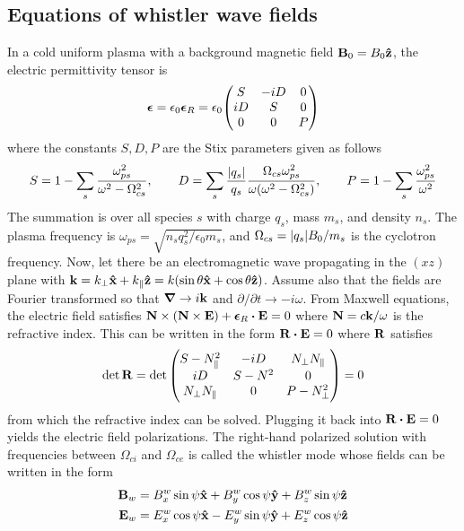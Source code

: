 \subsection{Equations of whistler wave fields}\label{sec:whistler}

In a cold uniform plasma with a background magnetic field
$\vb{B}_0=B_0\vb{\hat{z}}$, the electric
permittivity tensor is
\begin{equation}
    \bm\epsilon=\epsilon_0\bm\epsilon_R=\epsilon_0\mqty(S&-iD&0\\iD&S&0\\0&0&P)
\end{equation}
where the constants $S,D,P$ are the Stix parameters \citep{Stix1992} given as
follows
\begin{equation}
    S=1-\sum_s\frac{\omega_{ps}^2}{\omega^2-\Omega_{cs}^2}, \qquad
    D=\sum_s\frac{\abs{q_s}}{q_s}\frac{\Omega_{cs}\omega_{ps}^2}{\omega\qty(\omega^2-\Omega_{cs}^2)},
    \qquad P=1-\sum_s\frac{\omega_{ps}^2}{\omega^2}
\end{equation}
The summation is over all species $s$ with charge $q_s$, mass $m_s$, and density
$n_s$.  The plasma frequency is $\omega_{ps}=\sqrt{n_sq_s^2/\epsilon_0m_s}$, and
$\Omega_{cs}=\abs{q_s}B_0/m_s$ is the cyclotron frequency. Now, let there be an
electromagnetic wave propagating in the $(xz)$ plane with
$\vb{k}=k_\bot\vb{\hat{x}}+k_\parallel\vb{\hat{z}}=k\qty(\sin\theta\vb{\hat{x}}+\cos\theta\vb{\hat{z}})$.
Assume also that the fields are Fourier transformed so that $\grad\to i\vb{k}$
and $\partial/\partial t\to-i\omega$. From Maxwell equations, the electric
field satisfies
$\vb{N}\times\qty(\vb{N}\times\vb{E})+\bm\epsilon_R\vdot\vb{E}=0$ where
$\vb{N}=c\vb{k}/\omega$ is the refractive index.  This can be written in the
form $\vb{R}\vdot\vb{E}=0$ where $\vb{R}$ satisfies
\begin{equation}
    \det\vb{R}=\det\mqty(
        S-N_\parallel^2 & -iD & N_\bot N_\parallel\\
        iD & S-N^2 & 0\\
        N_\bot N_\parallel & 0 & P-N_\bot^2
    )=0
\end{equation}
from which the refractive index can be solved. Plugging it back into
$\vb{R}\vdot\vb{E}=0$ yields the electric field polarizations. The right-hand
polarized solution with frequencies between $\Omega_{ci}$ and $\Omega_{ce}$ is called the whistler mode whose fields can be written in
the form
\begin{subequations}\label{eq:whistler_EM_fields}
 \begin{align}
    \vb{B}_w&=B_x^w\sin\psi\vb{\hat{x}} + B_y^w\cos\psi\vb{\hat{y}} + B_z^w
    \sin\psi\vb{\hat{z}}\label{eq:whistler_magnetic_field}\\
    \vb{E}_w&=E_x^w\cos\psi\vb{\hat{x}}-E_y^w\sin\psi\vb{\hat{y}}+E_z^w\cos\psi\vb{\hat{z}}\label{eq:whistler_electric_field}
\end{align}
\end{subequations}
